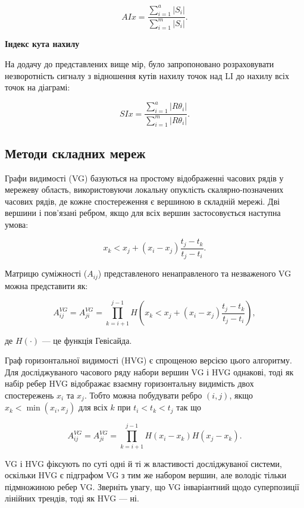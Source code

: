 \documentclass[
  letterpaper,
]{report}
\begin{document}
\[ 
AIx = \frac{\sum_{i=1}^{a}|S_{i}|}{\sum_{i=1}^{m}|S_{i}|}. 
\]

\textbf{Індекс кута нахилу}

На додачу до представлених вище мір, було запропоновано розраховувати
незворотність сигналу з відношення кутів нахилу точок над LI до нахилу
всіх точок на діаграмі:

\[ 
SIx = \frac{\sum_{i=1}^{a}|R\theta_{i}|}{\sum_{i=1}^{m}|R\theta_{i}|}. 
\]

\hypertarget{ux43cux435ux442ux43eux434ux438-ux441ux43aux43bux430ux434ux43dux438ux445-ux43cux435ux440ux435ux436}{%
\subsection{Методи складних
мереж}\label{ux43cux435ux442ux43eux434ux438-ux441ux43aux43bux430ux434ux43dux438ux445-ux43cux435ux440ux435ux436}}

Графи видимості (VG) базуються на простому відображенні часових рядів у
мережеву область, використовуючи локальну опуклість скалярно-позначених
часових рядів, де кожне спостереження є вершиною в складній мережі. Дві
вершини і пов'язані ребром, якщо для всіх вершин застосовується наступна
умова:

\[ 
x_{k} < x_{j} + \left( x_{i} - x_{j} \right) \frac{t_{j}-t_{k}}{t_{j}-t_{i}}. 
\]

Матрицю суміжності (\(A_{ij}\)) представленого ненаправленого та
незваженого VG можна представити як:

\[ 
A_{ij}^{VG} = A_{ji}^{VG} = \prod_{k=i+1}^{j-1} H \left( x_{k} < x_{j} + \left( x_{i} - x_{j} \right) \frac{t_{j}-t_{k}}{t_{j}-t_{i}} \right), 
\]

де \(H( \cdot )\) --- це функція Гевісайда.

Граф горизонтальної видимості (HVG) є спрощеною версією цього алгоритму.
Для досліджуваного часового ряду набори вершин VG і HVG однакові, тоді
як набір ребер HVG відображає взаємну горизонтальну видимість двох
спостережень \(x_{i}\) та \(x_{j}\). Тобто можна побудувати ребро
\((i,j)\), якщо \(x_{k} < \min(x_{i}, x_{j})\) для всіх \(k\) при
\(t_{i} < t_{k} < t_{j}\) так що

\[ 
A_{ij}^{VG} = A_{ji}^{VG} = \prod_{k=i+1}^{j-1} H \left( x_{i} - x_{k} \right) H \left( x_{j} - x_{k} \right). 
\]

VG і HVG фіксують по суті одні й ті ж властивості досліджуваної системи,
оскільки HVG є підграфом VG з тим же набором вершин, але володіє тільки
підмножиною ребер VG. Зверніть увагу, що VG інваріантний щодо
суперпозиції лінійних трендів, тоді як HVG --- ні.
\end{document}
